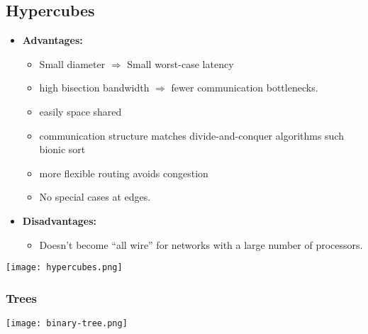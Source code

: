 \documentclass[../main.tex]{subfiles}
\begin{document}
\subsection{Hypercubes}

\begin{multicols}{2}
	\begin{itemize}
		\item \textbf{Advantages:}
		      \begin{itemize}
			      \item Small diameter \(\Rightarrow\) Small worst-case latency
			      \item high bisection bandwidth \(\Rightarrow\) fewer communication bottlenecks.
			      \item easily space shared
			      \item communication structure matches divide-and-conquer algorithms such bionic sort
			      \item more flexible routing avoids congestion
			      \item No special cases at edges.
		      \end{itemize}
		\item \textbf{Disadvantages:}
		      \begin{itemize}
			      \item Doesn’t become “all wire” for networks with a large number of processors.
		      \end{itemize}
	\end{itemize}

	\begin{center}
		\texttt{[image: hypercubes.png]}
	\end{center}
\end{multicols}

\subsubsection{Trees}


\begin{center}
	\texttt{[image: binary-tree.png]}
\end{center}
\end{document}
